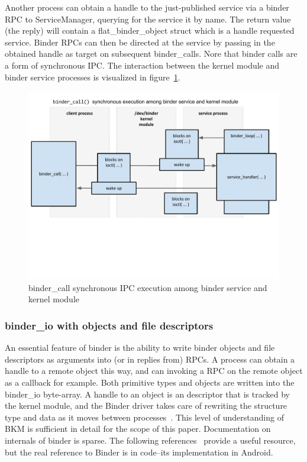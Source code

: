 \documentclass[prodmode]{acmlarge}
\begin{document}
Another process can obtain a handle to the just-published service via a binder RPC to ServiceManager, querying for the service it by name. The return value (the reply) will contain a flat\_binder\_object struct which is a handle requested service. Binder RPCs can then be directed at the service by passing in the obtained handle as target on subsequent binder\_calls. Nore that binder calls are a form of synchronous IPC. The interaction between the kernel module and binder service processes is visualized in figure~\ref{fig:binder_call}.
\begin{figure}[h]
\centering
\includegraphics[width=\textwidth]{drawings/binder_call.pdf}
\caption{binder\_call synchronous IPC execution among binder service and kernel module}
\label{fig:binder_call}
\end{figure}

\subsubsection{binder\_io with objects and file descriptors}
An essential feature of binder is the ability to write binder objects and file descriptors as arguments into (or in replies from) RPCs. A process can obtain a handle to a remote object this way, and can invoking a RPC on the remote object as a callback for example. Both primitive types and objects are written into the binder\_io byte-array. A handle to an object is an descriptor that is tracked by the kernel module, and the Binder driver takes care of rewriting the structure type and data as it moves between processes~\cite{BinderSourceComment}. This level of understanding of BKM is sufficient in detail for the scope of this paper. Documentation on internals of binder is sparse. The following references~\cite{BinderLinuxFoundation,BinderMastersThesis} provide a useful resource, but the real reference to Binder is in code--its implementation in Android.
\end{document}
